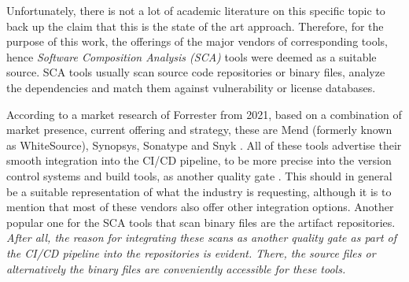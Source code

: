 Unfortunately, there is not a lot of academic literature on this specific topic to back up the claim that this is the state of the art approach. Therefore, for the purpose of this work, the offerings of the major vendors of corresponding tools, hence \emph{Software Composition Analysis (SCA)} tools were deemed as a suitable source. SCA tools usually scan source code repositories or binary files, analyze the dependencies and match them against vulnerability or license databases.\par
According to a market research of Forrester from 2021, based on a combination of market presence, current offering and strategy, these are Mend (formerly known as WhiteSource), Synopsys, Sonatype and Snyk \cite{ForresterSCA}. All of these tools advertise their smooth integration into the CI/CD pipeline, to be more precise into the version control systems and build tools, as another quality gate \cite{MendIntegration, BDBAIntegration, SonatypeIntegration, SnykIntegration}. This should in general be a suitable representation of what the industry is requesting, although it is to mention that most of these vendors also offer other integration options. Another popular one for the SCA tools that scan binary files are the artifact repositories.\\

\emph{After all, the reason for integrating these scans as another quality gate as part of the CI/CD pipeline into the repositories is evident.  There, the source files or alternatively the binary files are conveniently accessible for these tools.}

